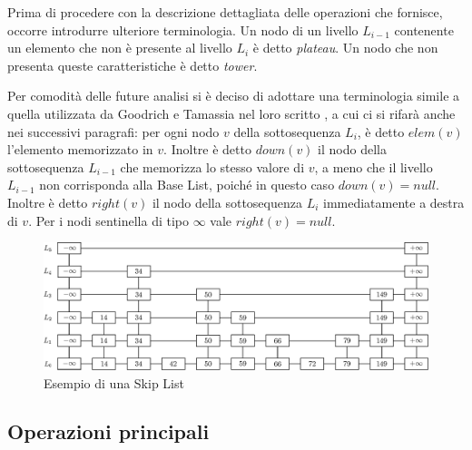 	Prima di procedere con la descrizione dettagliata delle operazioni che fornisce, occorre introdurre ulteriore terminologia. Un nodo di un livello $ L_{i-1} $ contenente un elemento che non è presente al livello $ L_{i} $ è detto \textit{plateau}. Un nodo che non presenta queste caratteristiche è detto \textit{tower}. \cite{authskiplist}
	
	Per comodità delle future analisi si è deciso di adottare una terminologia simile a quella utilizzata da Goodrich e Tamassia nel loro scritto \cite{authskiplist}, a cui ci si rifarà anche nei successivi paragrafi: per ogni nodo $ v $ della sottosequenza $ L_{i} $, è detto $ elem(v) $ l'elemento memorizzato in $ v $. Inoltre è detto $ down(v) $ il nodo della sottosequenza $ L_{i-1} $ che memorizza lo stesso valore di $ v $, a meno che il livello $ L_{i-1} $ non corrisponda alla Base List, poiché in questo caso $ down(v) = null$.
	Inoltre è detto $ right(v) $ il nodo della sottosequenza $ L_{i} $ immediatamente a destra di $ v $. Per i nodi sentinella di tipo $\infty$ vale $ right(v) = null $.
		
	\begin{figure}
		\centering
		\includegraphics[scale=0.6]{figure/skiplist.eps}
		\caption{Esempio di una Skip List}\label{fig:skiplist}
	\end{figure}
		
	\subsection{Operazioni principali}
	
%		


